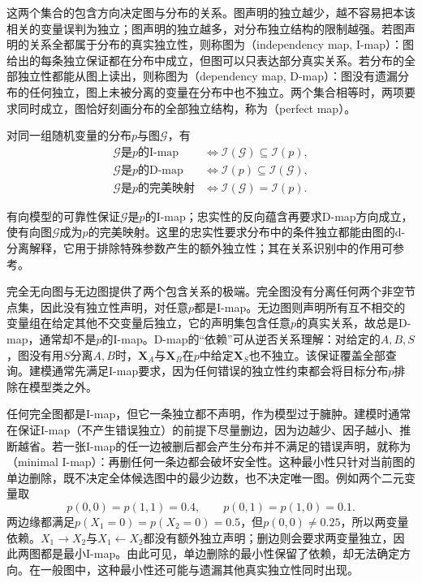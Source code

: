 这两个集合的包含方向决定图与分布的关系。图声明的独立越少，越不容易把本该相关的变量误判为独立；图声明的独立越多，对分布独立结构的限制越强。若图声明的关系全都属于分布的真实独立性，则称图为（independency map, I-map）：图给出的每条独立保证都在分布中成立，但图可以只表达部分真实关系。若分布的全部独立性都能从图上读出，则称图为（dependency map, D-map）：图没有遗漏分布的任何独立，图上未被分离的变量在分布中也不独立。两个集合相等时，两项要求同时成立，图恰好刻画分布的全部独立结构，称为（perfect map）。

\begin{definition}[三类独立性映射]
  \label{def:pgm-representations-maps}
  对同一组随机变量的分布$p$与图$\mathcal{G}$，有
  \begin{equation}
    \begin{aligned}
      \mathcal{G}\text{是}p\text{的I-map}
      &\iff \mathcal{I}(\mathcal{G})\subseteq\mathcal{I}(p),\\
      \mathcal{G}\text{是}p\text{的D-map}
      &\iff \mathcal{I}(p)\subseteq\mathcal{I}(\mathcal{G}),\\
      \mathcal{G}\text{是}p\text{的完美映射}
      &\iff \mathcal{I}(\mathcal{G})=\mathcal{I}(p).
    \end{aligned}
    \label{eq:pgm-representations-map-inclusions}
  \end{equation}
\end{definition}

有向模型的可靠性保证$\mathcal{G}$是$p$的I-map；忠实性的反向蕴含再要求D-map方向成立，使有向图$\mathcal{G}$成为$p$的完美映射。这里的忠实性要求分布中的条件独立都能由图的d-分离解释，它用于排除特殊参数产生的额外独立性；其在关系识别中的作用可参考。

完全无向图与无边图提供了两个包含关系的极端。完全图没有分离任何两个非空节点集，因此没有独立性声明，对任意$p$都是I-map。无边图则声明所有互不相交的变量组在给定其他不交变量后独立，它的声明集包含任意$p$的真实关系，故总是D-map，通常却不是$p$的I-map。D-map的“依赖”可从逆否关系理解：对给定的$A,B,S$，图没有用$S$分离$A,B$时，$\bm{X}_A$与$\bm{X}_B$在$p$中给定$\bm{X}_S$也不独立。该保证覆盖全部查询。建模通常先满足I-map要求，因为任何错误的独立性约束都会将目标分布$p$排除在模型类之外。

任何完全图都是I-map，但它一条独立都不声明，作为模型过于臃肿。建模时通常在保证I-map（不产生错误独立）的前提下尽量删边，因为边越少、因子越小、推断越省。若一张I-map的任一边被删后都会产生分布并不满足的错误声明，就称为（minimal I-map）：再删任何一条边都会破坏安全性。这种最小性只针对当前图的单边删除，既不决定全体候选图中的最少边数，也不决定唯一图。例如两个二元变量取
\[
  p(0,0)=p(1,1)=0.4,\qquad
  p(0,1)=p(1,0)=0.1.
\]
两边缘都满足$p(X_1=0)=p(X_2=0)=0.5$，但$p(0,0)\ne0.25$，所以两变量依赖。$X_1\to X_2$与$X_1\leftarrow X_2$都没有额外独立声明；删边则会要求两变量独立，因此两图都是最小I-map。由此可见，单边删除的最小性保留了依赖，却无法确定方向。在一般图中，这种最小性还可能与遗漏其他真实独立性同时出现。


